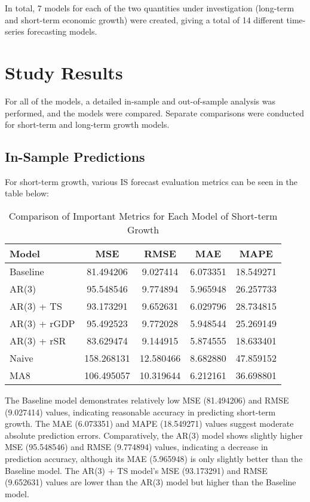 \documentclass[12pt]{article}
\begin{document}
In total, 7 models for each of the two quantities under investigation (long-term and short-term economic growth) were created, giving a total of 14 different time-series forecasting models.

\newpage 

\section{Study Results}

For all of the models, a detailed in-sample and out-of-sample analysis was performed, and the models were compared. Separate comparisons were conducted for short-term and long-term growth models.


\subsection{In-Sample Predictions}

For short-term growth, various IS forecast evaluation metrics can be seen in the table below:

\begin{table}[H]
\centering
\begin{tabular}{lcccc}
\hline
Model & MSE & RMSE & MAE & MAPE \\
\hline
Baseline & 81.494206 & 9.027414 & 6.073351 & 18.549271 \\
AR(3) & 95.548546 & 9.774894 & 5.965948 & 26.257733 \\
AR(3) + TS & 93.173291 & 9.652631 & 6.029796 & 28.734815 \\
AR(3) + rGDP & 95.492523 & 9.772028 & 5.948544 & 25.269149 \\
AR(3) + rSR & 83.629474 & 9.144915 & 5.874555 & 18.633401 \\
Naive & 158.268131 & 12.580466 & 8.682880 & 47.859152 \\
MA8 & 106.495057 & 10.319644 & 6.212161 & 36.698801 \\
\hline
\end{tabular}
\caption{Comparison of Important Metrics for Each Model of Short-term Growth}
\label{tab:model_comparison_lt}
\end{table}

The Baseline model demonstrates relatively low MSE (81.494206) and RMSE (9.027414) values, indicating reasonable accuracy in predicting short-term growth. The MAE (6.073351) and MAPE (18.549271) values suggest moderate absolute prediction errors. Comparatively, the AR(3) model shows slightly higher MSE (95.548546) and RMSE (9.774894) values, indicating a decrease in prediction accuracy, although its MAE (5.965948) is only slightly better than the Baseline model. The AR(3) + TS model's MSE (93.173291) and RMSE (9.652631) values are lower than the AR(3) model but higher than the Baseline model.
\end{document}
